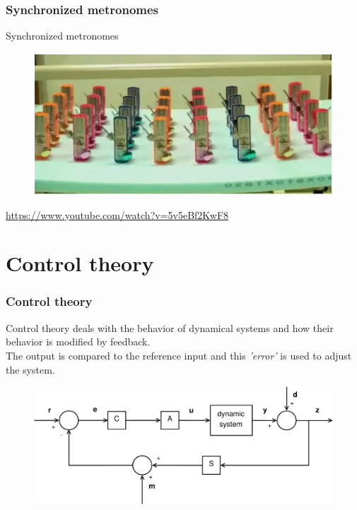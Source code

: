 \documentclass{beamer}
\begin{document}
\begin{frame}
\frametitle{Synchronized metronomes}
Synchronized metronomes
\begin{figure}
\includegraphics[scale=0.8]{synchronized_metronomes}
\end{figure}
\url{https://www.youtube.com/watch?v=5v5eBf2KwF8}
\end{frame}


%
%

\section{Control theory}

\begin{frame}
\frametitle{Control theory}
Control theory deals with the behavior of dynamical systems and how their behavior is modified by feedback.\\
The output is compared to the reference input and this \textit{'error'} is used to adjust the system. 
\bigskip
\begin{figure}
\includegraphics[width=1\linewidth]{full_system1}
\end{figure}
\end{frame}
\end{document}
